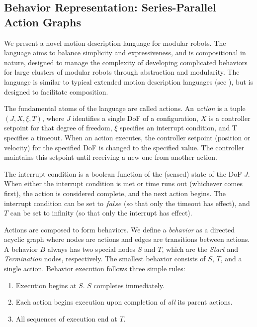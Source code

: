 \documentclass[conference]{IEEEtran}
\theoremstyle{definition}
\begin{document}
\subsection{Behavior Representation: Series-Parallel Action Graphs}
\label{sec:behavior-representation}
We present a novel motion description language for modular robots.  The
language aims to balance simplicity and expressiveness, and is compositional in
nature, designed to manage the complexity of developing complicated behaviors
for large clusters of modular robots through abstraction and modularity. The language
is similar to typical extended motion description languages (see \cite{hristu2003motion}),
but is designed to facilitate  composition.
 
The fundamental atoms of the language are called actions.  An \textit{action} is a tuple \(
(J, X, \xi, T)\), where \(J\) identifies a single DoF of a configuration, \(X\) is a
controller setpoint for that degree of freedom, \(\xi\) specifies an interrupt
condition, and T specifies a timeout. When an action executes, the controller
setpoint (position or velocity) for the specified DoF is changed to the specified
value. The controller maintains this setpoint until receiving a new one from another
action. 

The interrupt condition is a boolean function of the (sensed) state of the DoF \(J\).
When either the interrupt condition is met or time runs out (whichever comes
first), the action is considered complete, and the next action  begins. The
interrupt condition can be set to \(false\) (so that only the timeout has effect),
and \(T\) can be set to infinity (so that only the interrupt has effect).

Actions are composed to form behaviors. We define a \textit{behavior} as a directed acyclic graph where nodes are
actions and edges are transitions between actions.  A behavior \(B\) always has
two special nodes \(S\) and \(T\), which are the \textit{Start} and
\textit{Termination} nodes, respectively.  The smallest behavior consists of
\(S\), \(T\), and a single action.  Behavior execution follows three simple
rules:

\begin{enumerate}
\item Execution begins at \(S\).  \(S\) completes immediately.
\item Each action begins execution upon completion of \textit{all} its parent actions.
\item All sequences of execution end at \(T\).
\end{enumerate}
\end{document}
